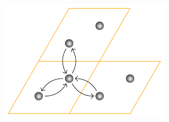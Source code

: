 \documentclass{beamer}
\newcommand \inlinetitle[1]{\begin{center} \color{MidnightBlue} \bf \Large #1 \end{center}}
\begin{document}
	\begin{frame}
		\begin{minipage}[b][0.48\textwidth][c]{0.48\textwidth}
			\includegraphics[width=\textwidth]{Abbildungen/Raumstrukturen/Graphen.pdf}
		\end{minipage}
		\hfill
		\begin{minipage}[b][0.48\textwidth][c]{0.48\textwidth}
			\only<2>{
				\inlinetitle{$\mathbf C_{\boldsymbol 2}$}
}
\end{minipage}
\end{frame}
\end{document}
